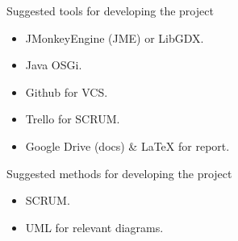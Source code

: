 \documentclass[../main.tex]{subfiles}
\begin{document}
Suggested tools for developing the project
\begin{itemize}
	\item JMonkeyEngine (JME) or LibGDX.
	\item Java OSGi.
	\item Github for VCS.
	\item Trello for SCRUM.
	\item Google Drive (docs) \& \LaTeX{} for report.
\end{itemize}
Suggested methods for developing the project
\begin{itemize}
	\item SCRUM.
	\item UML for relevant diagrams.
\end{itemize}
\end{document}
